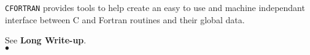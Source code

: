                   
                    
              
{\tt CFORTRAN} provides tools to help create an easy to use and
machine independant interface between C and Fortran routines
and their global data.

\Usage
See {\bf Long Write-up}.
\\ $\bullet$

